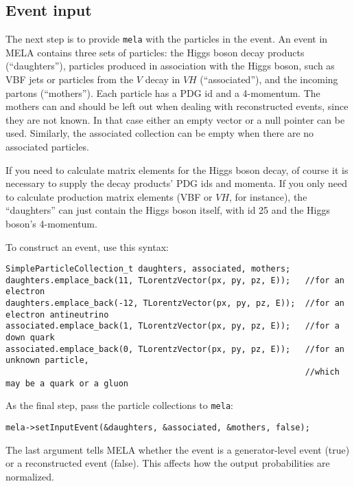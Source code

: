 \documentclass[aps,superscriptaddress,nofootinbib]{revtex4}
\begin{document}
\subsection{Event input}
The next step is to provide \texttt{mela} with the particles in the event.  An event in MELA contains three sets of particles: the Higgs boson decay products (``daughters''), particles produced in association with the Higgs boson, such as VBF jets or particles from the $V$ decay in $VH$ (``associated''), and the incoming partons (``mothers'').  Each particle has a PDG id and a 4-momentum.  The mothers can and should be left out when dealing with reconstructed events, since they are not known.  In that case either an empty vector or a null pointer can be used.  Similarly, the associated collection can be empty when there are no associated particles.

If you need to calculate matrix elements for the Higgs boson decay, of course it is necessary to supply the decay products' PDG ids and momenta.  If you only need to calculate production matrix elements (VBF or $VH$, for instance), the ``daughters'' can just contain the Higgs boson itself, with id 25 and the Higgs boson's 4-momentum.

To construct an event, use this syntax:
\begin{verbatim}
SimpleParticleCollection_t daughters, associated, mothers;
daughters.emplace_back(11, TLorentzVector(px, py, pz, E));   //for an electron
daughters.emplace_back(-12, TLorentzVector(px, py, pz, E));  //for an electron antineutrino
associated.emplace_back(1, TLorentzVector(px, py, pz, E));   //for a down quark
associated.emplace_back(0, TLorentzVector(px, py, pz, E));   //for an unknown particle,
                                                             //which may be a quark or a gluon
\end{verbatim}

As the final step, pass the particle collections to \texttt{mela}:
\begin{verbatim}
mela->setInputEvent(&daughters, &associated, &mothers, false);
\end{verbatim}
The last argument tells MELA whether the event is a generator-level event (true) or a reconstructed event (false).  This affects how the output probabilities are normalized.
\end{document}
